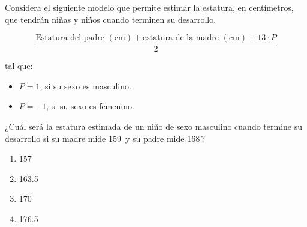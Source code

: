 \begin{problem}
    Considera el siguiente modelo que permite estimar la estatura, en centímetros, que tendrán niñas y niños cuando terminen su desarrollo.

    \[
    \frac{\text{Estatura del padre }(\text{cm}) + \text{estatura de la madre }(\text{cm}) + 13 \cdot P}{2}
    \]

    tal que:
    \begin{itemize}
        \item $P = 1$, si su sexo es masculino.
        \item $P = -1$, si su sexo es femenino.
    \end{itemize}

    ¿Cuál será la estatura estimada de un niño de sexo masculino cuando termine su desarrollo si su madre mide 159\, y su padre mide 168\,?

    \begin{enumerate}[label=\Alph*.]
        \item 157\,
        \item 163.5\,
        \item 170\,
        \item 176.5\,
    \end{enumerate}
\end{problem}
